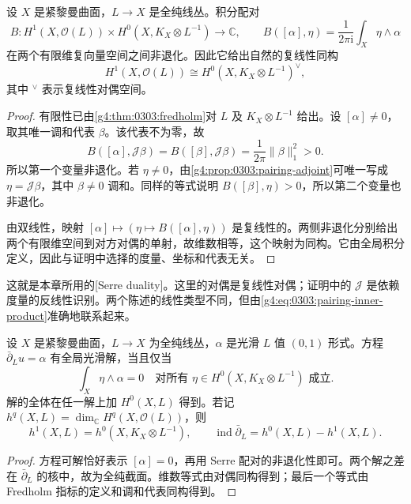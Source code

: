 \begin{theorem}
	\label{g4:thm:0303:serre-duality}
	设 \(X\) 是紧黎曼曲面，\(L\to X\) 是全纯线丛。积分配对
	\[
		B:H^1(X,\mathcal O(L))\times
		H^0(X,K_X\otimes L^{-1})\longrightarrow\mathbb C,
		\qquad
		B([\alpha],\eta)=\frac1{2\pi\mathrm{i}}\int_X\eta\wedge\alpha
	\]
	在两个有限维复向量空间之间非退化。因此它给出自然的复线性同构
	\begin{equation}
		\label{g4:eq:0303:serre-duality}
		H^1(X,\mathcal O(L))
		\cong H^0(X,K_X\otimes L^{-1})^\vee,
	\end{equation}
	其中 \({}^\vee\) 表示复线性对偶空间。
\end{theorem}
\begin{proof}
	有限性已由\cref{g4:thm:0303:fredholm}对 \(L\) 及 \(K_X\otimes L^{-1}\) 给出。设 \([\alpha]\ne0\)，取其唯一调和代表 \(\beta\)。该代表不为零，故
	\[
		B([\alpha],\mathcal J\beta)
		=B([\beta],\mathcal J\beta)
		=\frac1{2\pi}\|\beta\|_1^2>0.
	\]
	所以第一个变量非退化。若 \(\eta\ne0\)，由\cref{g4:prop:0303:pairing-adjoint}可唯一写成 \(\eta=\mathcal J\beta\)，其中 \(\beta\ne0\) 调和。同样的等式说明 \(B([\beta],\eta)>0\)，所以第二个变量也非退化。

	由双线性，映射 \([\alpha]\mapsto(\eta\mapsto B([\alpha],\eta))\) 是复线性的。两侧非退化分别给出两个有限维空间到对方对偶的单射，故维数相等，这个映射为同构。它由全局积分定义，因此与证明中选择的度量、坐标和代表无关。
\end{proof}

这就是本章所用的[Serre duality]。这里的对偶是复线性对偶；证明中的 \(\mathcal J\) 是依赖度量的反线性识别。两个陈述的线性类型不同，但由\eqref{g4:eq:0303:pairing-inner-product}准确地联系起来。

\begin{corollary}
	\label{g4:cor:0303:solvability}
	设 \(X\) 是紧黎曼曲面，\(L\to X\) 为全纯线丛，\(\alpha\) 是光滑 \(L\) 值 \((0,1)\) 形式。方程 \(\bar\partial_Lu=\alpha\) 有全局光滑解，当且仅当
	\[
		\int_X\eta\wedge\alpha=0
		\quad\text{对所有 }\eta\in H^0(X,K_X\otimes L^{-1})\text{ 成立}.
	\]
	解的全体在任一解上加 \(H^0(X,L)\) 得到。若记 \(h^q(X,L)=\dim_{\mathbb C}H^q(X,\mathcal O(L))\)，则
	\[
		h^1(X,L)=h^0(X,K_X\otimes L^{-1}),\qquad
		\operatorname{ind}\bar\partial_L=h^0(X,L)-h^1(X,L).
	\]
\end{corollary}
\begin{proof}
	方程可解恰好表示 \([\alpha]=0\)，再用 Serre 配对的非退化性即可。两个解之差在 \(\bar\partial_L\) 的核中，故为全纯截面。维数等式由对偶同构得到；最后一个等式由 Fredholm 指标的定义和调和代表同构得到。
\end{proof}

